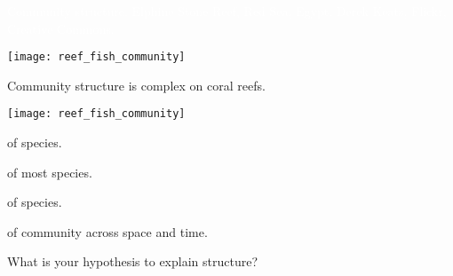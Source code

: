 \documentclass[t]{beamer}
\begin{document}
{
\begin{frame}[b]{\textcolor{white}{Community structure.}}
\tiny\textcolor{white}{Elphine Stone Reef, Red Sea, Egypt. Derek Keats, Flickr, Creative Commons.}
\end{frame}
}


\begin{frame}[t]{}

\begin{multicols}{2}
	{\centering
	\texttt{[image: reef\_fish\_community]}\par}
\columnbreak
	
	\hangpara{}
	
	\hangpara{}
	
	\hangpara{}
	
	\hangpara{}
	
	\hangpara{}\newline {}
	
	\hangpara {} 
\end{multicols}

\end{frame}


\begin{frame}[t]{Community structure is complex on coral reefs.}

\begin{multicols}{2}
	{\centering
	\texttt{[image: reef\_fish\_community]}\par}
\columnbreak
	
	\hangpara{} of species.
	
	\hangpara{} of most species.
	
	\hangpara{} of species.
	
	\hangpara{}
	
	\hangpara{} of community across space and time.
	
	\hangpara What is your hypothesis to explain structure?
\end{multicols}

\end{frame}

{
\begin{frame}[b]{}
\end{frame}
}
\end{document}
